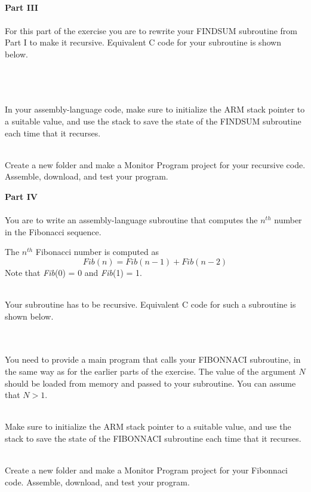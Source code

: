 \documentclass[epsfig,10pt,fullpage]{article}
\newcommand{\CommonDocsPath}{../../../../common/docs}
\begin{document}
~\\
\noindent
{\bf Part III}
~\\
~\\
For this part of the exercise you are to rewrite your FINDSUM subroutine from Part I to make 
it recursive.  Equivalent C code for your subroutine is shown below.

~\\

~\\
~\\
\noindent
In your assembly-language code, make sure to initialize the ARM stack pointer to 
a suitable value, and use the stack to save the state of the FINDSUM subroutine each 
time that it recurses.

~\\
\noindent
Create a new folder and make a Monitor Program project for your recursive code.
Assemble, download, and test your program.

\newpage
\noindent
{\bf Part IV}
~\\
~\\
\noindent
You are to write an assembly-language subroutine that computes the $n^{th}$ number in 
the Fibonacci sequence.  

\noindent The $n^{th}$ Fibonacci number is computed as 
$$
Fib(n) = Fib(n - 1) + Fib(n - 2)
$$
\noindent
Note that {\it Fib}(0) = 0 and {\it Fib}(1) = 1.

~\\
\noindent
Your subroutine has to be recursive. Equivalent C code for such a subroutine is shown below. 

~\\

~\\
\noindent
You need to provide a main program that calls your FIBONNACI subroutine, in the same way as for
the earlier parts of the exercise. The value of the argument $N$ should be loaded from 
memory and passed to your subroutine.  You can assume that $N > 1$.

~\\
\noindent
Make sure to initialize the ARM stack pointer to 
a suitable value, and use the stack to save the state of the FIBONNACI subroutine each 
time that it recurses.

~\\
\noindent
Create a new folder and make a Monitor Program project for your Fibonnaci code.
Assemble, download, and test your program.



\end{document}
